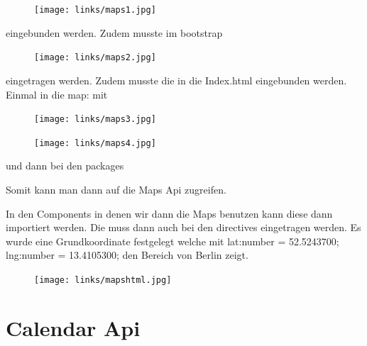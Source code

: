 \documentclass[12pt,titlepage]{article}
\begin{document}
\begin{figure}[h]
\begin{center}
\texttt{[image: links/maps1.jpg]}
\label{scene_intro_scale}
\end{center}
\end{figure}

eingebunden werden. Zudem musste im bootstrap 

\begin{figure}[h]
\begin{center}
\texttt{[image: links/maps2.jpg]}
\label{scene_intro_scale}
\end{center}
\end{figure}

eingetragen werden. Zudem musste die in die Index.html eingebunden werden. Einmal in die map: mit 

\begin{figure}[h]
\begin{center}
\texttt{[image: links/maps3.jpg]}
\label{scene_intro_scale}
\end{center}
\end{figure}

\begin{figure}[h]
\begin{center}
\texttt{[image: links/maps4.jpg]}
\label{scene_intro_scale}
\end{center}
\end{figure}

und dann bei den packages 



Somit kann man dann auf die Maps Api zugreifen. 

\newpage 
In den Components in denen wir dann die Maps benutzen kann diese dann importiert werden. Die muss dann auch bei den directives eingetragen werden. Es wurde eine Grundkoordinate festgelegt welche mit lat:number = 52.5243700;
    lng:number = 13.4105300; den Bereich von Berlin zeigt.
    
\begin{figure}[h]
\begin{center}
\texttt{[image: links/mapshtml.jpg]}
\label{scene_intro_scale}
\end{center}
\end{figure}


\newpage
\section{Calendar Api}
\end{document}
